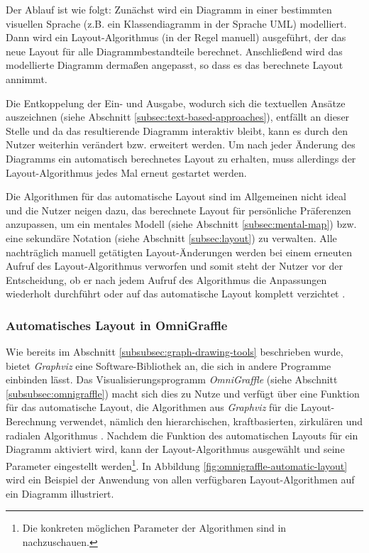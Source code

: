 Der Ablauf ist wie folgt: Zunächst wird ein Diagramm in einer bestimmten visuellen Sprache (z.B. ein Klassendiagramm in der Sprache UML) modelliert. Dann wird ein Layout-Algorithmus (in der Regel manuell) ausgeführt, der das neue Layout für alle Diagrammbestandteile berechnet. Anschließend wird das modellierte Diagramm dermaßen angepasst, so dass es das berechnete Layout annimmt.

Die Entkoppelung der Ein- und Ausgabe, wodurch sich die textuellen Ansätze auszeichnen (siehe Abschnitt \ref{subsec:text-based-approaches}), entfällt an dieser Stelle und da das resultierende Diagramm interaktiv bleibt, kann es durch den Nutzer weiterhin verändert bzw. erweitert werden. Um nach jeder Änderung des Diagramms ein automatisch berechnetes Layout zu erhalten, muss allerdings der Layout-Algorithmus jedes Mal erneut gestartet werden.

Die Algorithmen für das automatische Layout sind im Allgemeinen nicht ideal und die Nutzer neigen dazu, das berechnete Layout für persönliche Präferenzen anzupassen, um ein mentales Modell (siehe Abschnitt \ref{subsec:mental-map}) bzw. eine sekundäre Notation (siehe Abschnitt \ref{subsec:layout}) zu verwalten. Alle nachträglich manuell getätigten Layout-Änderungen werden bei einem erneuten Aufruf des Layout-Algorithmus verworfen und somit steht der Nutzer vor der Entscheidung, ob er nach jedem Aufruf des Algorithmus die Anpassungen wiederholt durchführt oder auf das automatische Layout komplett verzichtet \cite[S.119ff]{Eiglsperger04Automatic}.

\subsubsection{Automatisches Layout in OmniGraffle}
\label{subsubsec:omnigraffle-auto-layout}

Wie bereits im Abschnitt \ref{subsubsec:graph-drawing-tools} beschrieben wurde, bietet \textit{Graphviz} eine Software-Bibliothek an, die sich in andere Programme einbinden lässt. Das Visualisierungsprogramm \textit{OmniGraffle} (siehe Abschnitt \ref{subsubsec:omnigraffle}) macht sich dies zu Nutze und verfügt über eine Funktion für das automatische Layout, die Algorithmen aus \textit{Graphviz} für die Layout-Berechnung verwendet, nämlich den hierarchischen, kraftbasierten, zirkulären und radialen Algorithmus \cite{Olsen10OmniGraffle}. Nachdem die Funktion des automatischen Layouts für ein Diagramm aktiviert wird, kann der Layout-Algorithmus ausgewählt und seine Parameter eingestellt werden\footnote{Die konkreten möglichen Parameter der Algorithmen sind in \cite[S.74]{08OmniGraffle} nachzuschauen.}. In Abbildung \ref{fig:omnigraffle-automatic-layout} wird ein Beispiel der Anwendung von allen verfügbaren Layout-Algorithmen auf ein Diagramm illustriert.


